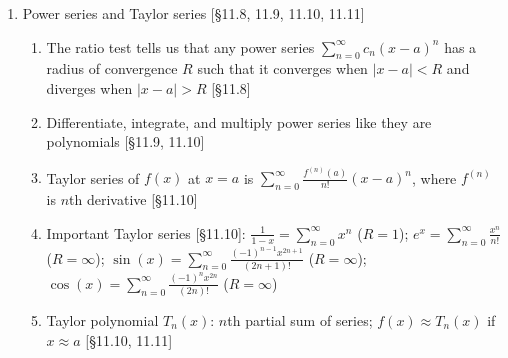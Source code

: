 \documentclass[11pt]{article}
\begin{document}
\begin{enumerate}
\item Power series and Taylor series [\S11.8, 11.9, 11.10, 11.11]
\begin{enumerate}
\item The ratio test tells us that any power series $\sum_{n=0}^{\infty} c_n (x-a)^n$ has a radius of convergence $R$ such that it converges when $|x-a|<R$ and diverges when $|x-a|>R$ [\S11.8]
\item Differentiate, integrate, and multiply power series like they are polynomials [\S11.9, 11.10]
\item Taylor series of $f(x)$ at $x=a$ is $\sum_{n=0}^{\infty} \frac{f^{(n)}(a)}{n!} (x-a)^n$, where $f^{(n)}$ is $n$th derivative [\S11.10]
\item Important Taylor series [\S11.10]: $\frac{1}{1-x} = \sum_{n=0}^{\infty} x^n$ ($R=1$); \; $e^x = \sum_{n=0}^{\infty} \frac{x^n}{n!}$ ($R=\infty$); \; $\sin(x) = \sum_{n=0}^{\infty} \frac{(-1)^{n-1}x^{2n+1}}{(2n+1)!}$ ($R=\infty$); \; $\cos(x)=\sum_{n=0}^{\infty}\frac{(-1)^{n}x^{2n}}{(2n)!}$ ($R=\infty$)
\item Taylor polynomial $T_n(x)$: $n$th partial sum of series; $f(x) \approx T_n(x)$ if $x\approx a$ [\S11.10, 11.11]
\end{enumerate}
\end{enumerate}
\end{document}
